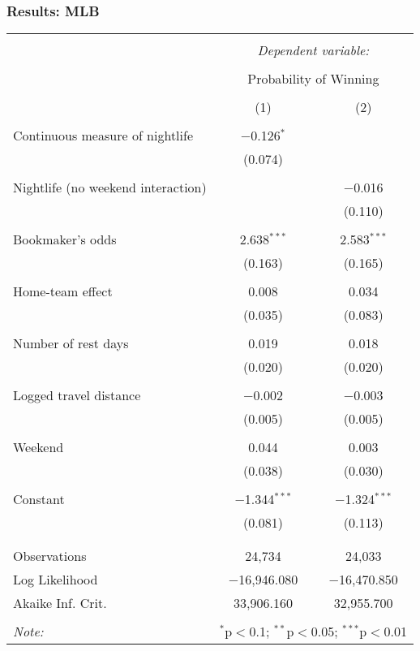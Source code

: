 \documentclass{beamer}
\begin{document}
\begin{frame}   \frametitle{Results: MLB}
  \centering
  \tiny{
  \begin{tabular}{@{\extracolsep{5pt}}lcc}  \\[-1.8ex]\hline  \hline \\[-1.8ex]   & \multicolumn{2}{c}{\textit{Dependent variable:}} \\  \cline{2-3}  \\[-1.8ex] & \multicolumn{2}{c}{Probability of Winning} \\  \\[-1.8ex] & (1) & (2)\\  \hline \\[-1.8ex]   Continuous measure of nightlife & $-$0.126$^{*}$ &  \\    & (0.074) &  \\    & & \\   Nightlife (no weekend interaction) &  & $-$0.016 \\    &  & (0.110) \\    & & \\   Bookmaker's odds & 2.638$^{***}$ & 2.583$^{***}$ \\    & (0.163) & (0.165) \\    & & \\   Home-team effect & 0.008 & 0.034 \\    & (0.035) & (0.083) \\    & & \\   Number of rest days & 0.019 & 0.018 \\    & (0.020) & (0.020) \\    & & \\   Logged travel distance & $-$0.002 & $-$0.003 \\    & (0.005) & (0.005) \\    & & \\   Weekend & 0.044 & 0.003 \\    & (0.038) & (0.030) \\    & & \\   Constant & $-$1.344$^{***}$ & $-$1.324$^{***}$ \\    & (0.081) & (0.113) \\    & & \\  \hline \\[-1.8ex]  Observations & 24,734 & 24,033 \\  Log Likelihood & $-$16,946.080 & $-$16,470.850 \\  Akaike Inf. Crit. & 33,906.160 & 32,955.700 \\  \hline  \hline \\[-1.8ex]  \textit{Note:}  & \multicolumn{2}{r}{$^{*}$p$<$0.1; $^{**}$p$<$0.05; $^{***}$p$<$0.01} \\  \end{tabular}  
} \end{frame}
\end{document}
